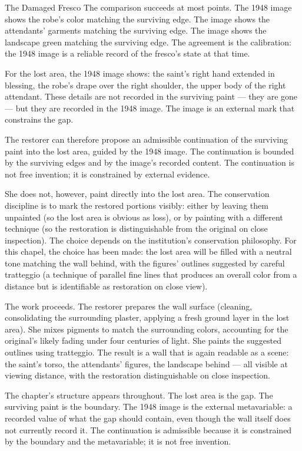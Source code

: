 \begin{coda}{The Damaged Fresco}
The comparison succeeds at most points. The 1948 image shows the
robe's color matching the surviving edge. The image shows the
attendants' garments matching the surviving edge. The image shows
the landscape green matching the surviving edge. The agreement is
the calibration: the 1948 image is a reliable record of the
fresco's state at that time.

For the lost area, the 1948 image shows: the saint's right hand
extended in blessing, the robe's drape over the right shoulder,
the upper body of the right attendant. These details are not
recorded in the surviving paint --- they are gone --- but they are
recorded in the 1948 image. The image is an external mark that
constrains the gap.

The restorer can therefore propose an admissible continuation of
the surviving paint into the lost area, guided by the 1948 image.
The continuation is bounded by the surviving edges and by the
image's recorded content. The continuation is not free invention;
it is constrained by external evidence.

She does not, however, paint directly into the lost area. The
conservation discipline is to mark the restored portions visibly:
either by leaving them unpainted (so the lost area is obvious as
loss), or by painting with a different technique (so the
restoration is distinguishable from the original on close
inspection). The choice depends on the institution's
conservation philosophy. For this chapel, the choice has been
made: the lost area will be filled with a neutral tone matching
the wall behind, with the figures' outlines suggested by careful
tratteggio (a technique of parallel fine lines that produces an
overall color from a distance but is identifiable as restoration
on close view).

The work proceeds. The restorer prepares the wall surface (cleaning,
consolidating the surrounding plaster, applying a fresh ground
layer in the lost area). She mixes pigments to match the
surrounding colors, accounting for the original's likely fading
under four centuries of light. She paints the suggested outlines
using tratteggio. The result is a wall that is again readable as
a scene: the saint's torso, the attendants' figures, the
landscape behind --- all visible at viewing distance, with the
restoration distinguishable on close inspection.

The chapter's structure appears throughout. The lost area is the
gap. The surviving paint is the boundary. The 1948 image is the
external metavariable: a recorded value of what the gap should
contain, even though the wall itself does not currently record
it. The continuation is admissible because it is constrained
by the boundary and the metavariable; it is not free invention.


\end{coda}
